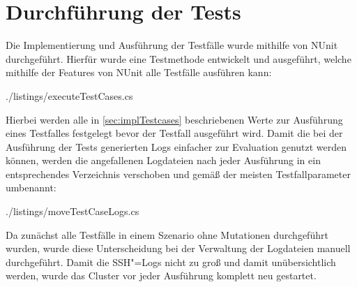 \section{Durchführung der Tests}
\label{sec:testExecution}

Die Implementierung und Ausführung der Testfälle wurde mithilfe von NUnit durchgeführt.
Hierfür wurde eine Testmethode entwickelt und ausgeführt, welche mithilfe der Features von NUnit alle Testfälle ausführen kann:


{./listings/executeTestCases.cs}

Hierbei werden alle in \autoref{sec:implTestcases} beschriebenen Werte zur Ausführung eines Testfalles festgelegt bevor der Testfall ausgeführt wird.
Damit die bei der Ausführung der Tests generierten Logs einfacher zur Evaluation genutzt werden können, werden die angefallenen Logdateien nach jeder Ausführung in ein entsprechendes Verzeichnis verschoben und gemäß der meisten Testfallparameter umbenannt:


{./listings/moveTestCaseLogs.cs}

Da zunächst alle Testfälle in einem Szenario ohne Mutationen durchgeführt wurden, wurde diese Unterscheidung bei der Verwaltung der Logdateien manuell durchgeführt.
Damit die SSH"=Logs nicht zu groß und damit unübersichtlich werden, wurde das Cluster vor jeder Ausführung komplett neu gestartet.
